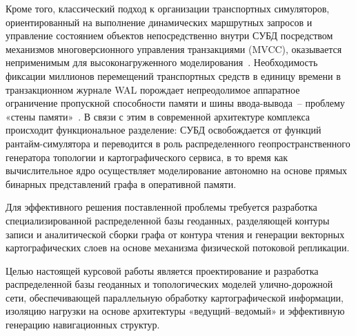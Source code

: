 Кроме того, классический подход к организации транспортных симуляторов, ориентированный на выполнение динамических маршрутных запросов и управление состоянием объектов непосредственно внутри СУБД посредством механизмов многоверсионного управления транзакциями (MVCC), оказывается неприменимым для высоконагруженного моделирования~\cite{postgrespro_mvcc_intro}. Необходимость фиксации миллионов перемещений транспортных средств в единицу времени в транзакционном журнале WAL порождает непреодолимое аппаратное ограничение пропускной способности памяти и шины ввода-вывода~-- проблему «стены памяти»~\cite{drepper2007memory, mutlu2020primer}. В связи с этим в современной архитектуре комплекса происходит функциональное разделение: СУБД освобождается от функций рантайм-симулятора и переводится в роль распределенного геопространственного генератора топологии и картографического сервиса, в то время как вычислительное ядро осуществляет моделирование автономно на основе прямых бинарных представлений графа в оперативной памяти.

Для эффективного решения поставленной проблемы требуется разработка специализированной распределенной базы геоданных, разделяющей контуры записи и аналитической сборки графа от контура чтения и генерации векторных картографических слоев на основе механизма физической потоковой репликации.

Целью настоящей курсовой работы является проектирование и разработка распределенной базы геоданных и топологических моделей улично-дорожной сети, обеспечивающей параллельную обработку картографической информации, изоляцию нагрузки на основе архитектуры «ведущий--ведомый» и эффективную генерацию навигационных структур.

